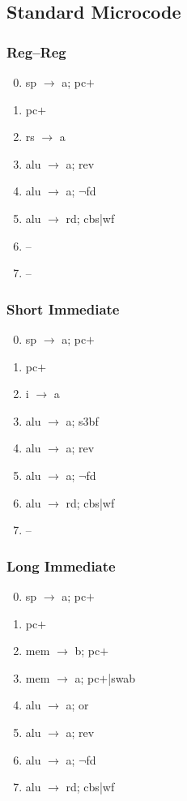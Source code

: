 \documentclass[11pt]{book}
\begin{document}
\subsection*{Standard Microcode}
\begin{multicols}{3}\ttfamily\selectfont\small
  \subsubsection*{Reg--Reg}
  \begin{enumerate}\setcounter{enumi}{-1}
  \item sp \(\rightarrow\) a; pc\(+\)
  \item pc\(+\)
  \item rs \(\rightarrow\) a
  \item alu \(\rightarrow\) a; rev
  \item alu \(\rightarrow\) a; \(\neg\)fd
  \item alu \(\rightarrow\) rd; cbs|wf
  \item --
  \item --
  \end{enumerate}
  \columnbreak
  \subsubsection*{Short Immediate}
  \begin{enumerate}\setcounter{enumi}{-1}
  \item sp \(\rightarrow\) a; pc\(+\)
  \item pc\(+\)
  \item i \(\rightarrow\) a
  \item alu \(\rightarrow\) a; s3bf
  \item alu \(\rightarrow\) a; rev
  \item alu \(\rightarrow\) a; \(\neg\)fd
  \item alu \(\rightarrow\) rd; cbs|wf
  \item --
  \end{enumerate}
  \columnbreak
  \subsubsection*{Long Immediate}
  \begin{enumerate}\setcounter{enumi}{-1}
  \item sp \(\rightarrow\) a; pc\(+\)
  \item pc\(+\)
  \item mem \(\rightarrow\) b; pc\(+\)
  \item mem \(\rightarrow\) a; pc\(+\)|swab
  \item alu \(\rightarrow\) a; or
  \item alu \(\rightarrow\) a; rev
  \item alu \(\rightarrow\) a; \(\neg\)fd
  \item alu \(\rightarrow\) rd; cbs|wf
  \end{enumerate}
\end{multicols}
\end{document}
